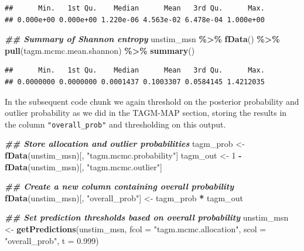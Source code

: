 \documentclass[9pt,a4paper,]{extarticle}
\newenvironment{Shaded}{\begin{snugshade}}{\end{snugshade}}
\newcommand{\AttributeTok}[1]{\textcolor[rgb]{0.13,0.29,0.53}{#1}}
\newcommand{\DecValTok}[1]{\textcolor[rgb]{0.00,0.00,0.81}{#1}}
\newcommand{\DocumentationTok}[1]{\textcolor[rgb]{0.56,0.35,0.01}{\textbf{\textit{#1}}}}
\newcommand{\FloatTok}[1]{\textcolor[rgb]{0.00,0.00,0.81}{#1}}
\newcommand{\FunctionTok}[1]{\textcolor[rgb]{0.13,0.29,0.53}{\textbf{#1}}}
\newcommand{\NormalTok}[1]{#1}
\newcommand{\OtherTok}[1]{\textcolor[rgb]{0.56,0.35,0.01}{#1}}
\newcommand{\SpecialCharTok}[1]{\textcolor[rgb]{0.81,0.36,0.00}{\textbf{#1}}}
\newcommand{\StringTok}[1]{\textcolor[rgb]{0.31,0.60,0.02}{#1}}
\begin{document}
\begin{verbatim}
##      Min.   1st Qu.    Median      Mean   3rd Qu.      Max. 
## 0.000e+00 0.000e+00 1.220e-06 4.563e-02 6.478e-04 1.000e+00
\end{verbatim}

\begin{Shaded}
\begin{Highlighting}[]
\DocumentationTok{\#\# Summary of Shannon entropy}
\NormalTok{unstim\_msn }\SpecialCharTok{\%\textgreater{}\%}
  \FunctionTok{fData}\NormalTok{() }\SpecialCharTok{\%\textgreater{}\%} 
  \FunctionTok{pull}\NormalTok{(tagm.mcmc.mean.shannon) }\SpecialCharTok{\%\textgreater{}\%} 
  \FunctionTok{summary}\NormalTok{()}
\end{Highlighting}
\end{Shaded}

\begin{verbatim}
##      Min.   1st Qu.    Median      Mean   3rd Qu.      Max. 
## 0.0000000 0.0000000 0.0001437 0.1003307 0.0584145 1.4212035
\end{verbatim}

In the subsequent code chunk we again threshold on the posterior probability
and outlier probability as we did in the TAGM-MAP section, storing the
results in the column \texttt{"overall\_prob"} and thresholding on this output.

\begin{Shaded}
\begin{Highlighting}[]
\DocumentationTok{\#\# Store allocation and outlier probabilities}
\NormalTok{tagm\_prob }\OtherTok{\textless{}{-}} \FunctionTok{fData}\NormalTok{(unstim\_msn)[, }\StringTok{"tagm.mcmc.probability"}\NormalTok{]}
\NormalTok{tagm\_out }\OtherTok{\textless{}{-}} \DecValTok{1} \SpecialCharTok{{-}} \FunctionTok{fData}\NormalTok{(unstim\_msn)[, }\StringTok{"tagm.mcmc.outlier"}\NormalTok{]}

\DocumentationTok{\#\# Create a new column containing overall probability}
\FunctionTok{fData}\NormalTok{(unstim\_msn)[, }\StringTok{"overall\_prob"}\NormalTok{] }\OtherTok{\textless{}{-}}\NormalTok{ tagm\_prob }\SpecialCharTok{*}\NormalTok{ tagm\_out}

\DocumentationTok{\#\# Set prediction thresholds based on overall probability}
\NormalTok{unstim\_msn }\OtherTok{\textless{}{-}} \FunctionTok{getPredictions}\NormalTok{(unstim\_msn, }
                             \AttributeTok{fcol =} \StringTok{"tagm.mcmc.allocation"}\NormalTok{, }
                             \AttributeTok{scol =} \StringTok{"overall\_prob"}\NormalTok{, }
                             \AttributeTok{t =} \FloatTok{0.999}\NormalTok{)}
\end{Highlighting}
\end{Shaded}
\end{document}
